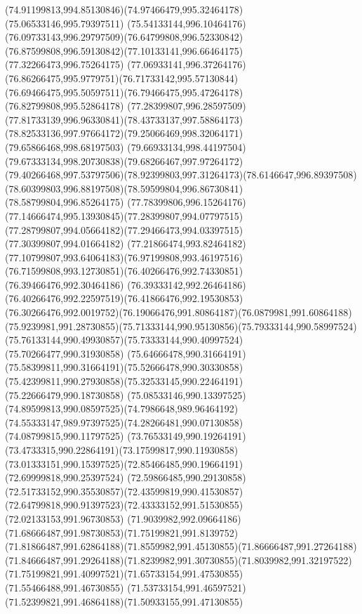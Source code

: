 {{\curveto(74.91199813,994.85130846)(74.97466479,995.32464178)(75.06533146,995.79397511)
\curveto(75.54133144,996.10464176)(76.09733143,996.29797509)(76.64799808,996.52330842)
\curveto(76.87599808,996.59130842)(77.10133141,996.66464175)(77.32266473,996.75264175)
\curveto(77.06933141,996.37264176)(76.86266475,995.9779751)(76.71733142,995.57130844)
\curveto(76.69466475,995.50597511)(76.79466475,995.47264178)(76.82799808,995.52864178)
\curveto(77.28399807,996.28597509)(77.81733139,996.96330841)(78.43733137,997.58864173)
\curveto(78.82533136,997.97664172)(79.25066469,998.32064171)(79.65866468,998.68197503)
\curveto(79.66933134,998.44197504)(79.67333134,998.20730838)(79.68266467,997.97264172)
\curveto(79.40266468,997.53797506)(78.92399803,997.31264173)(78.6146647,996.89397508)
\curveto(78.60399803,996.88197508)(78.59599804,996.86730841)(78.58799804,996.85264175)
\curveto(77.78399806,996.15264176)(77.14666474,995.13930845)(77.28399807,994.07797515)
\curveto(77.28799807,994.05664182)(77.29466473,994.03397515)(77.30399807,994.01664182)
\curveto(77.21866474,993.82464182)(77.10799807,993.64064183)(76.97199808,993.46197516)
\curveto(76.71599808,993.12730851)(76.40266476,992.74330851)(76.39466476,992.30464186)
\curveto(76.39333142,992.26464186)(76.40266476,992.22597519)(76.41866476,992.19530853)
\curveto(76.30266476,992.0019752)(76.19066476,991.80864187)(76.0879981,991.60864188)
\curveto(75.9239981,991.28730855)(75.71333144,990.95130856)(75.79333144,990.58997524)
\curveto(75.76133144,990.49930857)(75.73333144,990.40997524)(75.70266477,990.31930858)
\curveto(75.64666478,990.31664191)(75.58399811,990.31664191)(75.52666478,990.30330858)
\curveto(75.42399811,990.27930858)(75.32533145,990.22464191)(75.22666479,990.18730858)
\curveto(75.08533146,990.13397525)(74.89599813,990.08597525)(74.7986648,989.96464192)
\curveto(74.55333147,989.97397525)(74.28266481,990.07130858)(74.08799815,990.11797525)
\curveto(73.76533149,990.19264191)(73.4733315,990.22864191)(73.17599817,990.11930858)
\curveto(73.01333151,990.15397525)(72.85466485,990.19664191)(72.69999818,990.25397524)
\curveto(72.59866485,990.29130858)(72.51733152,990.35530857)(72.43599819,990.41530857)
\curveto(72.64799818,990.91397523)(72.43333152,991.51530855)(72.02133153,991.96730853)
\curveto(71.9039982,992.09664186)(71.68666487,991.98730853)(71.75199821,991.8139752)
\curveto(71.81866487,991.62864188)(71.8559982,991.45130855)(71.86666487,991.27264188)
\curveto(71.84666487,991.29264188)(71.8239982,991.30730855)(71.8039982,991.32197522)
\curveto(71.75199821,991.40997521)(71.65733154,991.47530855)(71.55466488,991.46730855)
\curveto(71.53733154,991.46597521)(71.52399821,991.46864188)(71.50933155,991.47130855)
}}
